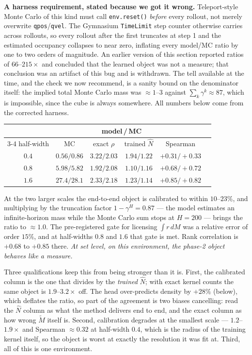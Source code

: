 \documentclass[10pt]{article}
\begin{document}
\textbf{A harness requirement, stated because we got it wrong.} Teleport-style
Monte Carlo of this kind must call \texttt{env.reset()} \emph{before} every
rollout, not merely overwrite \texttt{qpos}/\texttt{qvel}. The Gymnasium
\texttt{TimeLimit} step counter otherwise carries across rollouts, so every
rollout after the first truncates at step 1 and the estimated occupancy collapses
to near zero, inflating every model/MC ratio by one to two orders of magnitude.
An earlier version of this section reported ratios of $66$--$215\times$ and
concluded that the learned object was not a measure; that conclusion was an
artifact of this bug and is withdrawn. The tell available at the time, and the
check we now recommend, is a sanity bound on the denominator itself: the implied
total Monte Carlo mass was ${\approx}1$--$3$ against $\sum_k\gamma^k\approx 87$,
which is impossible, since the cube is always somewhere. All numbers below come
from the corrected harness.

\begin{center}\small
\begin{tabular}{c c c c c c}
\toprule
 & & \multicolumn{2}{c}{model\,/\,MC} & \\
\cmidrule(lr){3-4}
half-width & MC & exact $\rho$ & trained $\hat N$ & Spearman \\
\midrule
$0.4$ & $0.56/0.86$ & $3.22/2.03$ & $1.94/1.22$ & $+0.31/+0.33$ \\
$0.8$ & $5.98/5.82$ & $1.92/2.08$ & $\mathbf{1.10/1.16}$ & $+0.68/+0.72$ \\
$1.6$ & $27.4/28.1$ & $2.33/2.18$ & $\mathbf{1.23/1.14}$ & $+0.85/+0.82$ \\
\bottomrule
\end{tabular}
\end{center}

At the two larger scales the end-to-end object is calibrated to within
$10$--$23\%$, and multiplying by the truncation factor $1-\gamma^{H}=0.87$ --- the
model estimates an infinite-horizon mass while the Monte Carlo sum stops at
$H{=}200$ --- brings the ratio to ${\approx}1.0$. The pre-registered gate for
licensing $\int r\,dM$ was a relative error of order $15\%$, and at
half-widths $0.8$ and $1.6$ that gate is met. Rank correlation is $+0.68$ to
$+0.85$ there. \emph{At set level, on this environment, the phase-2 object
behaves like a measure.}

Three qualifications keep this from being stronger than it is. First, the
calibrated column is the one that divides by the \emph{trained} $\hat N$; with
exact kernel counts the same object is $1.9$--$3.2\times$ off. The head
over-predicts density by ${+}28\%$ (below), which deflates the ratio, so part of
the agreement is two biases cancelling: read the $\hat N$ column as what the
method delivers end to end, and the exact column as how wrong $\tilde M$ itself
is. Second, calibration degrades at the smallest scale --- $1.2$--$1.9\times$ and
Spearman ${\approx}0.32$ at half-width $0.4$, which is the radius of the training
kernel itself, so the object is worst at exactly the resolution it was fit at.
Third, all of this is one environment.
\end{document}
